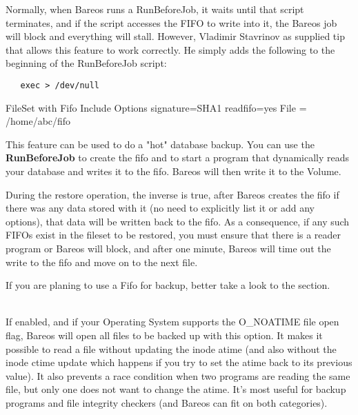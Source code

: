 \begin{description}
   Normally, when Bareos runs a RunBeforeJob, it waits until that
   script terminates, and if the script accesses the FIFO to write
   into it, the Bareos job will block and everything will stall.
   However, Vladimir Stavrinov as supplied tip that allows this feature
   to work correctly.  He simply adds the following to the beginning
   of the RunBeforeJob script:

\begin{verbatim}
   exec > /dev/null
\end{verbatim}


\begin{bconfig}{FileSet with Fifo}
Include {
  Options {
    signature=SHA1
    readfifo=yes
  }
  File = /home/abc/fifo
}
\end{bconfig}

   This feature can be used to do a "hot" database backup.  
   You can use the {\bf RunBeforeJob} to create the fifo
   and to start a program that dynamically reads your database and writes
   it to the fifo.  Bareos will then write it to the Volume. 

   During the restore operation, the inverse is true, after Bareos creates
   the fifo if there was any data stored with it (no need to explicitly
   list it or add any options), that data will be written back to the fifo.
   As a consequence, if any such FIFOs exist in the fileset to be restored,
   you must ensure that there is a reader program or Bareos will block, and
   after one minute, Bareos will time out the write to the fifo and move on
   to the next file.

    If you are planing to use a Fifo for backup, better take a look to the  section.


\item [noatime=yes{\textbar}no] \hfill \\
   If enabled, and if your Operating System supports the O\_NOATIME file
   open flag, Bareos will open all files to be backed up with this option.
   It makes it possible to read a file without updating the inode atime
   (and also without the inode ctime update which happens if you try to set
   the atime back to its previous value).  It also prevents a race
   condition when two programs are reading the same file, but only one does
   not want to change the atime.  It's most useful for backup programs and
   file integrity checkers (and Bareos can fit on both categories).


\end{description}
